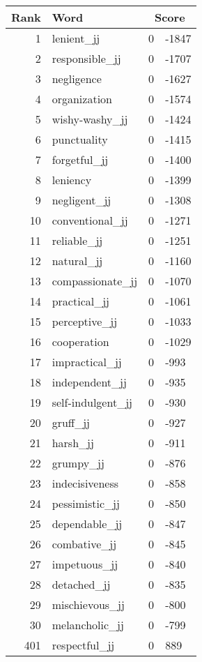 \begin{longtable}[!htbp]{| rlr@{.}l |}
    \hline
    \textbf{Rank} & \textbf{Word} & \multicolumn{2}{c|}{\textbf{Score}} \\
    \hline
    \endhead
    1 & lenient\_jj & 0 & -1847 \\
    2 & responsible\_jj & 0 & -1707 \\
    3 & negligence & 0 & -1627 \\
    4 & organization & 0 & -1574 \\
    5 & wishy-washy\_jj & 0 & -1424 \\
    6 & punctuality & 0 & -1415 \\
    7 & forgetful\_jj & 0 & -1400 \\
    8 & leniency & 0 & -1399 \\
    9 & negligent\_jj & 0 & -1308 \\
    10 & conventional\_jj & 0 & -1271 \\
    11 & reliable\_jj & 0 & -1251 \\
    12 & natural\_jj & 0 & -1160 \\
    13 & compassionate\_jj & 0 & -1070 \\
    14 & practical\_jj & 0 & -1061 \\
    15 & perceptive\_jj & 0 & -1033 \\
    16 & cooperation & 0 & -1029 \\
    17 & impractical\_jj & 0 & -993 \\
    18 & independent\_jj & 0 & -935 \\
    19 & self-indulgent\_jj & 0 & -930 \\
    20 & gruff\_jj & 0 & -927 \\
    21 & harsh\_jj & 0 & -911 \\
    22 & grumpy\_jj & 0 & -876 \\
    23 & indecisiveness & 0 & -858 \\
    24 & pessimistic\_jj & 0 & -850 \\
    25 & dependable\_jj & 0 & -847 \\
    26 & combative\_jj & 0 & -845 \\
    27 & impetuous\_jj & 0 & -840 \\
    28 & detached\_jj & 0 & -835 \\
    29 & mischievous\_jj & 0 & -800 \\
    30 & melancholic\_jj & 0 & -799 \\
    401 & respectful\_jj & 0 & 889 \\

\end{longtable}

